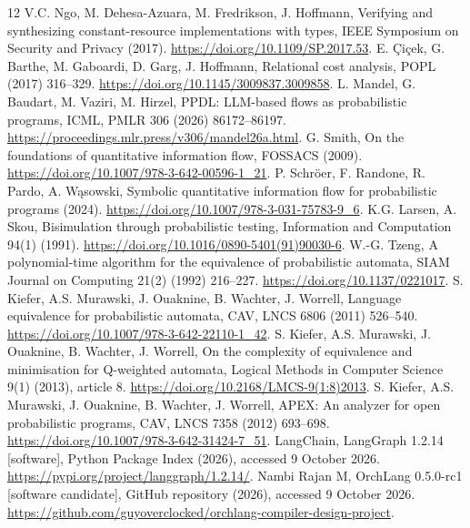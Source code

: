 \documentclass[preprint,12pt, a4paper]{elsarticle}
\begin{document}
\begin{thebibliography}{12}
 V.C. Ngo, M. Dehesa-Azuara, M. Fredrikson, J. Hoffmann, Verifying and synthesizing constant-resource implementations with types, IEEE Symposium on Security and Privacy (2017). \url{https://doi.org/10.1109/SP.2017.53}.
 E. \c{C}i\c{c}ek, G. Barthe, M. Gaboardi, D. Garg, J. Hoffmann, Relational cost analysis, POPL (2017) 316--329. \url{https://doi.org/10.1145/3009837.3009858}.
 L. Mandel, G. Baudart, M. Vaziri, M. Hirzel, PPDL: LLM-based flows as probabilistic programs, ICML, PMLR 306 (2026) 86172--86197. \url{https://proceedings.mlr.press/v306/mandel26a.html}.
 G. Smith, On the foundations of quantitative information flow, FOSSACS (2009). \url{https://doi.org/10.1007/978-3-642-00596-1_21}.
 P. Schr\"oer, F. Randone, R. Pardo, A. W\k{a}sowski, Symbolic quantitative information flow for probabilistic programs (2024). \url{https://doi.org/10.1007/978-3-031-75783-9_6}.
 K.G. Larsen, A. Skou, Bisimulation through probabilistic testing, Information and Computation 94(1) (1991). \url{https://doi.org/10.1016/0890-5401(91)90030-6}.
 W.-G. Tzeng, A polynomial-time algorithm for the equivalence of probabilistic automata, SIAM Journal on Computing 21(2) (1992) 216--227. \url{https://doi.org/10.1137/0221017}.
 S. Kiefer, A.S. Murawski, J. Ouaknine, B. Wachter, J. Worrell, Language equivalence for probabilistic automata, CAV, LNCS 6806 (2011) 526--540. \url{https://doi.org/10.1007/978-3-642-22110-1_42}.
 S. Kiefer, A.S. Murawski, J. Ouaknine, B. Wachter, J. Worrell, On the complexity of equivalence and minimisation for Q-weighted automata, Logical Methods in Computer Science 9(1) (2013), article 8. \url{https://doi.org/10.2168/LMCS-9(1:8)2013}.
 S. Kiefer, A.S. Murawski, J. Ouaknine, B. Wachter, J. Worrell, APEX: An analyzer for open probabilistic programs, CAV, LNCS 7358 (2012) 693--698. \url{https://doi.org/10.1007/978-3-642-31424-7_51}.
 LangChain, LangGraph 1.2.14 [software], Python Package Index (2026), accessed 9 October 2026. \url{https://pypi.org/project/langgraph/1.2.14/}.
 Nambi Rajan M, OrchLang 0.5.0-rc1 [software candidate], GitHub repository (2026), accessed 9 October 2026. \url{https://github.com/guyoverclocked/orchlang-compiler-design-project}.
\end{thebibliography}
\end{document}

